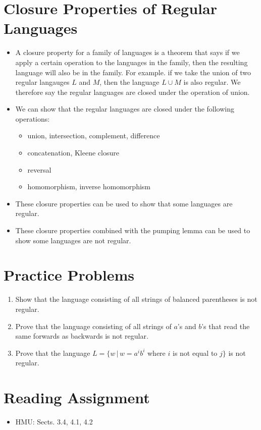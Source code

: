 \documentclass[]{article}
\begin{document}
\section{Closure Properties of Regular Languages}
  \begin{itemize}
    \item A closure property for a family of languages is a theorem that says if
    we apply a certain operation to the languages in the family, then the
    resulting language will also be in the family. For example. if we take the
    union of two regular langauges $L$ and $M$, then the language $L \cup M$ is
    also regular. We therefore say the regular languages are closed under the
    operation of union.
    \item We can show that the regular languages are closed under the following
    operations:
      \begin{itemize}
        \item union, intersection, complement, difference
        \item concatenation, Kleene closure
        \item reversal
        \item homomorphism, inverse homomorphism
      \end{itemize}
    \item These closure properties can be used to show that some languages are
    regular.
    \item These closure properties combined with the pumping lemma can be used
    to show some languages are not regular.
  \end{itemize}

\section{Practice Problems}
  \begin{enumerate}
    \item Show that the language consisting of all strings of balanced
    parentheses is not regular.
    \item Prove that the language consisting of all strings of $a$'s and $b$'s
    that read the same forwards as backwards is not regular.
    \item Prove that the language $L = \{ w \, | \, w = a^ib^i$ where $i$ is not
    equal to $j \}$ is not regular.
  \end{enumerate}

\section{Reading Assignment}
  \begin{itemize}
    \item HMU: Sects. 3.4, 4.1, 4.2
  \end{itemize}
\end{document}
